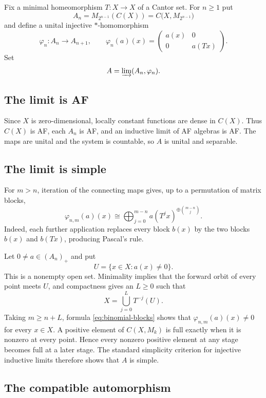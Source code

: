 \documentclass[11pt]{article}
\theoremstyle{remark}
\begin{document}
Fix a minimal homeomorphism $T\colon X\to X$ of a Cantor set.  For $n\geq1$
put
\[
  A_n=M_{2^{n-1}}(C(X))=C\bigl(X,M_{2^{n-1}}\bigr)
\]
and define a unital injective $*$-homomorphism
\[
  \varphi_n\colon A_n\longrightarrow A_{n+1},\qquad
  \varphi_n(a)(x)=
  \begin{pmatrix}
    a(x)&0\\
    0&a(Tx)
  \end{pmatrix}.
\]
Set
\[
  A=\varinjlim(A_n,\varphi_n).
\]

\subsection{The limit is AF}

Since $X$ is zero-dimensional, locally constant functions are dense in
$C(X)$.  Thus $C(X)$ is AF, each $A_n$ is AF, and an inductive limit of AF
algebras is AF.  The maps are unital and the system is countable, so $A$ is
unital and separable.

\subsection{The limit is simple}

For $m>n$, iteration of the connecting maps gives, up to a permutation of
matrix blocks,
\begin{equation}\label{eq:binomial-blocks}
 \varphi_{n,m}(a)(x)
 \cong
 \bigoplus_{j=0}^{m-n}
 a(T^j x)^{\oplus \binom{m-n}{j}}.
\end{equation}
Indeed, each further application replaces every block $b(x)$ by the two
blocks $b(x)$ and $b(Tx)$, producing Pascal's rule.

Let $0\neq a\in(A_n)_+$ and put
\[
  U=\{x\in X:a(x)\neq0\}.
\]
This is a nonempty open set.  Minimality implies that the forward orbit of
every point meets $U$, and compactness gives an $L\geq0$ such that
\[
  X=\bigcup_{j=0}^{L}T^{-j}(U).
\]
Taking $m\geq n+L$, formula \eqref{eq:binomial-blocks} shows that
$\varphi_{n,m}(a)(x)\neq0$ for every $x\in X$.  A positive element of
$C(X,M_k)$ is full exactly when it is nonzero at every point.  Hence every
nonzero positive element at any stage becomes full at a later stage.  The
standard simplicity criterion for injective inductive limits therefore
shows that $A$ is simple.

\subsection{The compatible automorphism}
\end{document}
